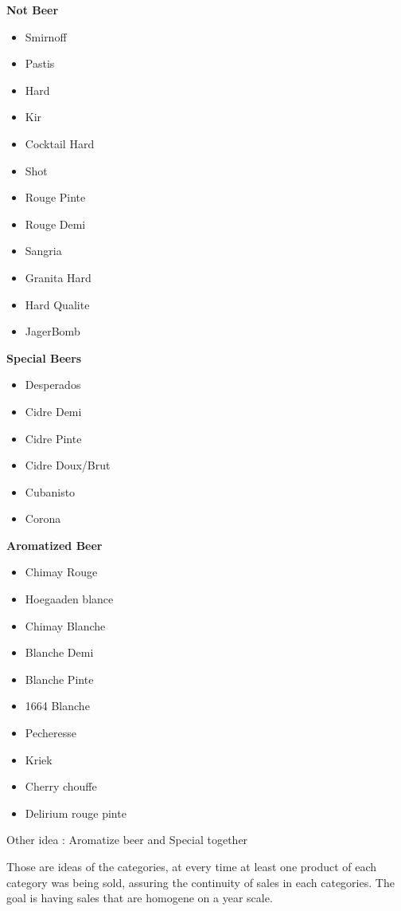 \documentclass{report}
\begin{document}
\begin{multicols}{3}

\textbf{Not Beer}
\begin{itemize}
\item Smirnoff
\item Pastis
\item Hard
\item Kir
\item Cocktail Hard
\item Shot
\item Rouge Pinte
\item Rouge Demi
\item Sangria
\item Granita Hard
\item Hard Qualite
\item JagerBomb
\end{itemize}

\columnbreak

\textbf{Special Beers}
\begin{itemize}
\item Desperados
\item Cidre Demi
\item Cidre Pinte
\item Cidre Doux/Brut
\item Cubanisto
\item Corona
\end{itemize}

\columnbreak

\textbf{Aromatized Beer}
\begin{itemize}
\item Chimay Rouge
\item Hoegaaden blance
\item Chimay Blanche
\item Blanche Demi
\item Blanche Pinte
\item 1664 Blanche
\item Pecheresse
\item Kriek
\item Cherry chouffe
\item Delirium rouge pinte
\end{itemize}

\end{multicols}


Other idea : Aromatize beer and Special together

Those are ideas of the categories, at every time at least one product of each category was being sold, assuring the continuity of sales in each categories. The goal is having sales that are homogene on a year scale.
\end{document}
